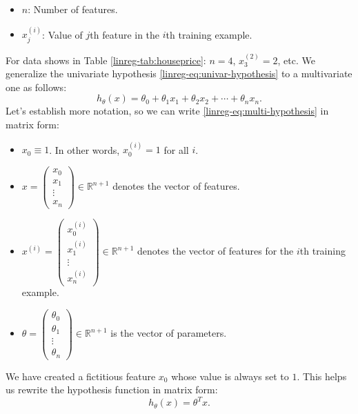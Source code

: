 \documentclass{article}
\begin{document}
\begin{itemize}
    \item $n$: Number of features.
    \item $x^{(i)}_{j}$: Value of $j$th feature in the $i$th training example.
\end{itemize}
For data shows in Table \ref{linreg-tab:houseprice}: $n=4$, $x^{(2)}_3=2$, etc. We generalize the univariate hypothesis \eqref{linreg-eq:univar-hypothesis} to a multivariate one as follows:
\begin{equation}
    h_{\theta}(x) = \theta_0 + \theta_1x_1 + \theta_2x_2 + \cdots + \theta_nx_n.
    \label{linreg-eq:multi-hypothesis}
\end{equation}
Let's establish more notation, so we can write \eqref{linreg-eq:multi-hypothesis} in matrix form:
\begin{itemize}
    \item $x_0 \equiv 1$. In other words, $x^{(i)}_0 = 1$ for all $i$.

    \item $x=
        \begin{pmatrix}
            x_0 \\
            x_1 \\
            \vdots \\
            x_n
        \end{pmatrix}
        \in \mathbb{R}^{n+1}
    $ denotes the vector of features.

    \item $x^{(i)}=
        \begin{pmatrix}
            x^{(i)}_0 \\
            x^{(i)}_1 \\
            \vdots \\
            x^{(i)}_n
        \end{pmatrix}
        \in \mathbb{R}^{n+1}
    $ denotes the vector of features for the $i$th training example. 

    \item $\theta =
        \begin{pmatrix}
            \theta_0 \\
            \theta_1 \\ 
            \vdots \\
            \theta_n
        \end{pmatrix}
        \in \mathbb{R}^{n+1}
    $ is the vector of parameters.
\end{itemize}
We have created a fictitious feature $x_0$ whose value is always set to $1$. This helps us rewrite the hypothesis function in matrix form:
\begin{equation}
    h_{\theta}(x) = \theta^Tx.
    \label{linreg-eq:multi-hypothesis-mat}
\end{equation}
\end{document}
